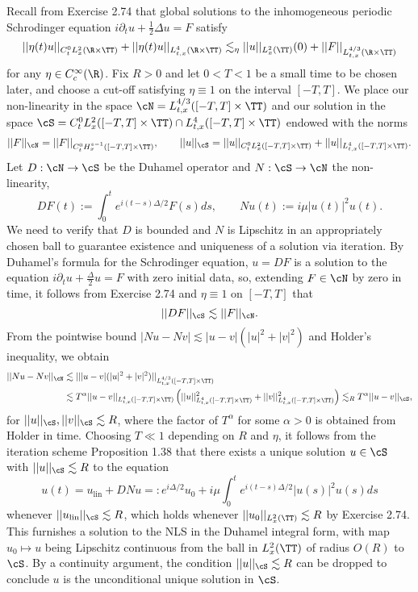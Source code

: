\begin{solution}
	Recall from Exercise 2.74 that global solutions to the inhomogeneous periodic Schrodinger equation $i \partial_t u + \tfrac12\Delta u = F$ satisfy 
		\[ ||\eta (t) u||_{C^0_t L^2_x (\R \times \TT)} + ||\eta(t) u||_{L^4_{t, x} (\R \times \TT)} \lesssim_\eta ||u||_{L^2_x (\TT)} (0) + ||F||_{L^{4/3}_{t, x} (\R \times \TT)}\]
	for any $\eta \in C^\infty_c (\R)$. Fix $R > 0$ and let $0 < T < 1$ be a small time to be chosen later, and choose a cut-off satisfying $\eta \equiv 1$ on the interval $[-T, T]$. We place our non-linearity in the space $\cN = L^{4/3}_{t, x} ([-T, T] \times \TT)$ and our solution in the space $\cS = C^0_t L^2_x ([-T, T] \times \TT) \cap L^4_{t, x} ([-T, T] \times \TT)$ endowed with the norms
		\[ ||F||_\cN = ||F||_{C^0_t H^{s - 1}_x ([-T, T] \times \TT)}, \qquad  ||u||_\cS = ||u||_{C^0_t L^2_x ([-T, T] \times \TT)} + ||u||_{L^4_{t, x} ([-T, T] \times \TT)}.\]
	Let $D: \cN \to \cS$ be the Duhamel operator and $N: \cS \to \cN$ the non-linearity,
		\[ DF (t) := \int_0^t e^{i(t - s) \Delta/2} F(s) ds, \qquad Nu (t) := i\mu |u(t)|^2 u(t). \]
	We need to verify that $D$ is bounded and $N$ is Lipschitz in an appropriately chosen ball to guarantee existence and uniqueness of a solution via iteration. 	By Duhamel's formula for the Schrodinger equation, $u = DF$ is a solution to the equation $i \partial_t u + \tfrac{\Delta}{2} u = F$ with zero initial data, so, extending $F \in \cN$ by zero in time, it follows from Exercise 2.74 and $\eta \equiv 1$ on $[-T, T]$ that 
			\[ ||DF||_\cS \lesssim ||F||_{\cN}. \]
	From the pointwise bound $|Nu - Nv| \lesssim |u - v| (|u|^2 + |v|^2)$ and Holder's inequality, we obtain
	\begin{align*}
		 ||Nu - Nv||_{\cN} 
		 	&\lesssim |||u - v|  (|u|^2 + |v|^2) ||_{L^{4/3}_{t, x} ([-T, T] \times \TT)} \\
		 	&\lesssim T^\alpha ||u - v||_{L^4_{t, x} ([-T, T] \times \TT)} \left( ||u||^2_{L^4_{t, x} ([-T, T] \times \TT)} + ||v||^2_{L^4_{t, x} ([-T, T] \times \TT)} \right) \lesssim_R T^\alpha ||u - v||_{\cS},
	\end{align*}			
	for $||u||_\cS, ||v||_\cS \lesssim R$, where the factor of $T^\alpha$ for some $\alpha > 0$ is obtained from Holder in time. Choosing $T \ll 1$ depending on $R$ and $\eta$, it follows from the iteration scheme Proposition 1.38 that there exists a unique solution $u \in \cS$ with $||u||_\cS \lesssim R$ to the equation 
		\[ u(t) = u_{\text{lin}} + DN u =: e^{i \Delta/2} u_0 + i\mu \int_0^t e^{i (t - s) \Delta/2} |u(s)|^2 u(s) ds\]
	whenever $||u_{\text{lin}}||_\cS \lesssim R$, which holds whenever $||u_0||_{L^2_x (\TT)} \lesssim R$ by Exercise 2.74. This furnishes a solution to the NLS in the Duhamel integral form, with map $u_0 \mapsto u$ being Lipschitz continuous from the ball in $L^2_x (\TT)$ of radius $O(R)$ to $\cS$. By a continuity argument, the condition $||u||_\cS \lesssim R$ can be dropped to conclude $u$ is the unconditional unique solution in $\cS$.
	

\end{solution}
